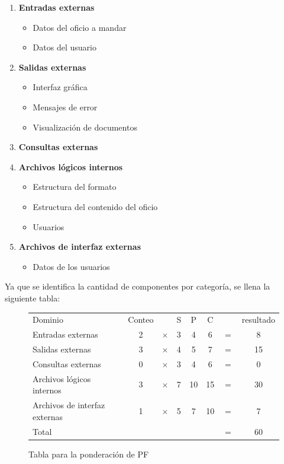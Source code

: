 \documentclass[letterpaper]{article}
\begin{document}
\begin{enumerate}
\item \textbf{Entradas externas}
  \begin{itemize}
  \item Datos del oficio a mandar
  \item Datos del usuario
  \end{itemize}
\item \textbf{Salidas externas}
  \begin{itemize}
  \item Interfaz gráfica
  \item Mensajes de error
  \item Visualización de documentos
  \end{itemize}
\item \textbf{Consultas externas}
\item \textbf{Archivos lógicos internos}
  \begin{itemize}
    \item Estructura del formato
    \item Estructura del contenido del oficio
    \item Usuarios
  \end{itemize}
\item \textbf{Archivos de interfaz externas}
  \begin{itemize}
  \item Datos de los usuarios
  \end{itemize}
\end{enumerate}

Ya que se identifica la cantidad de componentes por categoría, se llena la siguiente tabla:

\begin{figure}[h!]
  \begin{tabular}{ l c c c c c c c }
    Dominio & Conteo &  & S & P & C & & resultado \\
    Entradas externas & 2 & $\times$ & 3 & 4 & 6 & $=$ & 8\\
    Salidas externas & 3 & $\times$ & 4 & 5 & 7 & $=$ & 15\\
    Consultas externas & 0 & $\times$ & 3 & 4 & 6 & $=$ & 0\\
    Archivos lógicos internos & 3 & $\times$ & 7 & 10 & 15 & $=$ & 30\\
    Archivos de interfaz externas & 1 & $\times$ & 5 & 7 & 10 & $=$ & 7\\
    Total & & & & & & $=$ & 60 \\ 
  \end{tabular}
  \caption{Tabla para la ponderación de PF}
\end{figure}
\end{document}

